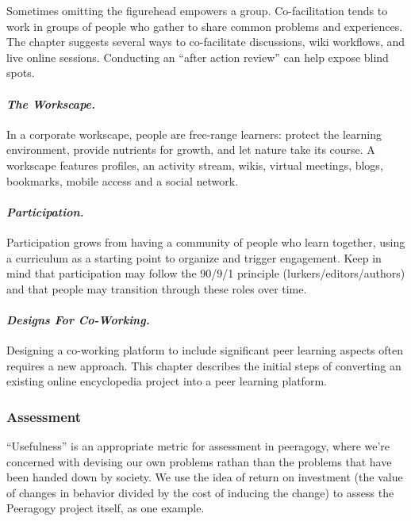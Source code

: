 Sometimes omitting the figurehead empowers a group. Co-facilitation
tends to work in groups of people who gather to share common problems
and experiences. The chapter suggests several ways to co-facilitate
discussions, wiki workflows, and live online sessions. Conducting an
``after action review'' can help expose blind spots.

\paragraph{\emph{The Workscape.}}\label{the-workscape.}

In a corporate workscape, people are free-range learners: protect the
learning environment, provide nutrients for growth, and let nature take
its course. A workscape features profiles, an activity stream, wikis,
virtual meetings, blogs, bookmarks, mobile access and a social network.

\paragraph{\emph{Participation.}}\label{participation.}

Participation grows from having a community of people who learn
together, using a curriculum as a starting point to organize and trigger
engagement. Keep in mind that participation may follow the 90/9/1
principle (lurkers/editors/authors) and that people may transition
through these roles over time.

\paragraph{\emph{Designs For
Co-Working.}}\label{designs-for-co-working.}

Designing a co-working platform to include significant peer learning
aspects often requires a new approach. This chapter describes the
initial steps of converting an existing online encyclopedia project into
a peer learning platform.

\subsubsection{Assessment}\label{assessment}

``Usefulness'' is an appropriate metric for assessment in peeragogy,
where we're concerned with devising our own problems rathan than the
problems that have been handed down by society. We use the idea of
return on investment (the value of changes in behavior divided by the
cost of inducing the change) to assess the Peeragogy project itself, as
one example.

